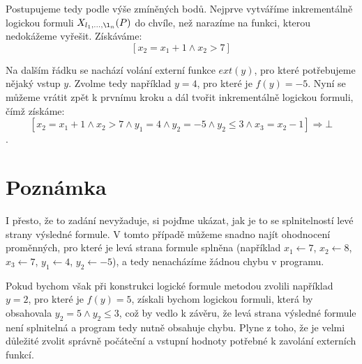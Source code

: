 \documentclass{article}
\begin{document}
Postupujeme tedy podle výše zmíněných bodů. Nejprve vytváříme inkrementálně logickou formuli $X_{l_1,\dots,\l_n}(P)$ do chvíle, než narazíme na funkci, kterou nedokážeme vyřešit. Získáváme:
$$[x_2 = x_1 + 1 \wedge x_2 > 7 ]$$

Na dalším řádku se nachází volání externí funkce $ext(y)$, pro které potřebujeme nějaký vstup $y$. Zvolme tedy například $y = 4$, pro které je $f(y) = -5$. Nyní se můžeme vrátit zpět k prvnímu kroku a dál tvořit inkrementálně logickou formuli, čímž získáme:
$$[x_2 = x_1 + 1 \wedge x_2 > 7 \wedge y_1 = 4 \wedge y_2 = -5 \wedge y_2 \leq 3 \wedge x_3 = x_2 - 1 ] \Rightarrow \bot$$. 

\section{Poznámka}
I přesto, že to zadání nevyžaduje, si pojďme ukázat, jak je to se splnitelností levé strany výsledné formule. V tomto případě můžeme snadno najít ohodnocení proměnných, pro které je levá strana formule splněna (například $x_1 \leftarrow 7$, $x_2 \leftarrow 8$, $x_3 \leftarrow 7$, $y_1 \leftarrow 4$, $y_2 \leftarrow -5$), a tedy nenacházíme žádnou chybu v programu.

Pokud bychom však při konstrukci logické formule metodou  zvolili například $y = 2$, pro které je $f(y) = 5$, získali bychom logickou formuli, která by obsahovala $y_2 = 5 \wedge y_2 \leq 3$, což by vedlo k závěru, že levá strana výsledné formule není splnitelná a program tedy nutně obsahuje chybu. Plyne z toho, že je velmi důležité zvolit správně počáteční a vstupní hodnoty potřebné k zavolání externích funkcí.
\end{document}
